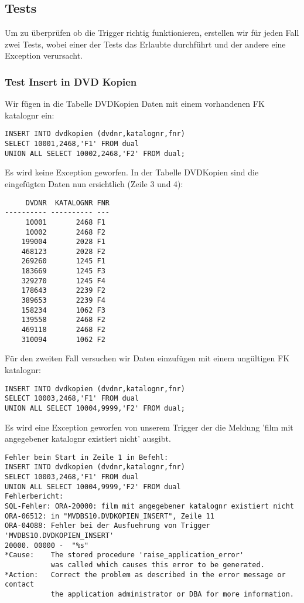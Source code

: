 \documentclass[11pt,a4paper,parskip=half]{scrartcl}
\begin{document}
\subsection{Tests}
Um zu überprüfen ob die Trigger richtig funktionieren, erstellen wir für jeden Fall zwei Tests, wobei einer der Tests das Erlaubte durchführt und der andere eine Exception verursacht.

\subsubsection{Test Insert in DVD Kopien}
Wir fügen in die Tabelle DVDKopien Daten mit einem vorhandenen FK katalognr ein:

\begin{lstlisting}
INSERT INTO dvdkopien (dvdnr,katalognr,fnr) 
SELECT 10001,2468,'F1' FROM dual 
UNION ALL SELECT 10002,2468,'F2' FROM dual;
\end{lstlisting}

Es wird keine Exception geworfen. In der Tabelle DVDKopien sind die eingefügten Daten nun ersichtlich (Zeile 3 und 4):

\begin{lstlisting}
     DVDNR  KATALOGNR FNR
---------- ---------- ---
     10001       2468 F1  
     10002       2468 F2  
    199004       2028 F1  
    468123       2028 F2  
    269260       1245 F1  
    183669       1245 F3  
    329270       1245 F4  
    178643       2239 F2  
    389653       2239 F4  
    158234       1062 F3  
    139558       2468 F2  
    469118       2468 F2  
    310094       1062 F2  
\end{lstlisting}

Für den zweiten Fall versuchen wir Daten einzufügen mit einem ungültigen FK katalognr:

\begin{lstlisting}
INSERT INTO dvdkopien (dvdnr,katalognr,fnr) 
SELECT 10003,2468,'F1' FROM dual 
UNION ALL SELECT 10004,9999,'F2' FROM dual;
\end{lstlisting}

Es wird eine Exception geworfen von unserem Trigger der die Meldung 'film mit angegebener katalognr existiert nicht' ausgibt.

\begin{lstlisting}
Fehler beim Start in Zeile 1 in Befehl:
INSERT INTO dvdkopien (dvdnr,katalognr,fnr) 
SELECT 10003,2468,'F1' FROM dual 
UNION ALL SELECT 10004,9999,'F2' FROM dual
Fehlerbericht:
SQL-Fehler: ORA-20000: film mit angegebener katalognr existiert nicht
ORA-06512: in "MVDBS10.DVDKOPIEN_INSERT", Zeile 11
ORA-04088: Fehler bei der Ausfuehrung von Trigger 'MVDBS10.DVDKOPIEN_INSERT'
20000. 00000 -  "%s"
*Cause:    The stored procedure 'raise_application_error'
           was called which causes this error to be generated.
*Action:   Correct the problem as described in the error message or contact
           the application administrator or DBA for more information.
\end{lstlisting}
\end{document}
